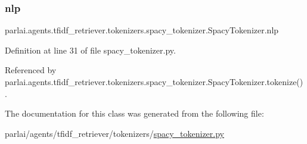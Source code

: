 \mbox{\label{classparlai_1_1agents_1_1tfidf__retriever_1_1tokenizers_1_1spacy__tokenizer_1_1SpacyTokenizer_a7124470b153c9ed25f1c7a1404dd8e1d}} 
\subsubsection{\texorpdfstring{nlp}{nlp}}
{\footnotesize\ttfamily parlai.\+agents.\+tfidf\+\_\+retriever.\+tokenizers.\+spacy\+\_\+tokenizer.\+Spacy\+Tokenizer.\+nlp}



Definition at line 31 of file spacy\+\_\+tokenizer.\+py.



Referenced by parlai.\+agents.\+tfidf\+\_\+retriever.\+tokenizers.\+spacy\+\_\+tokenizer.\+Spacy\+Tokenizer.\+tokenize().



The documentation for this class was generated from the following file\+:\begin{DoxyCompactItemize}
\item 
parlai/agents/tfidf\+\_\+retriever/tokenizers/\hyperlink{spacy__tokenizer_8py}{spacy\+\_\+tokenizer.\+py}\end{DoxyCompactItemize}
